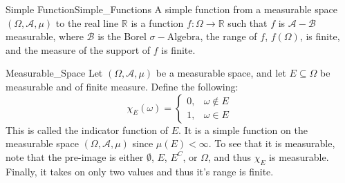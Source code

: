             \begin{ldefinition}{Simple Function}{Simple_Functions}
                A simple function from a measurable space
                $(\Omega,\mathcal{A},\mu)$ to the real line
                $\mathbb{R}$ is a function
                $f:\Omega\rightarrow\mathbb{R}$ such that
                $f$ is $\mathcal{A}-\mathcal{B}$ measurable,
                where $\mathcal{B}$ is the Borel
                $\sigma-\textrm{Algebra}$, the range of $f$,
                $f(\Omega)$, is finite, and the measure of the
                support of $f$ is finite.
            \end{ldefinition}
            \begin{lexample}{}{Measurable_Space}
                Let $(\Omega,\mathcal{A},\mu)$ be a measurable
                space, and let $E\subseteq\Omega$ be measurable
                and of finite measure. Define the following:
                \begin{equation}
                    \chi_{E}(\omega)=
                    \begin{cases}
                        0,&\omega\notin{E}\\
                        1,&\omega\in{E}
                    \end{cases}
                \end{equation}
                This is called the indicator function of
                $E$. It is a simple function on the measurable
                space $(\Omega,\mathcal{A},\mu)$ since
                $\mu(E)<\infty$. To see that it is measurable,
                note that the pre-image is either
                $\emptyset$, $E$, $E^{C}$, or $\Omega$, and thus
                $\chi_{E}$ is measurable. Finally, it takes on
                only two values and thus it's range is finite.
            \end{lexample}
